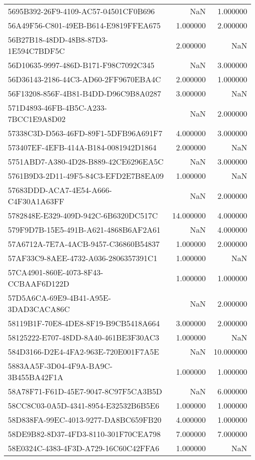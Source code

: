 \begin{tabular}{lrr}
5695B392-26F9-4109-AC57-04501CF0B696 & NaN & 1.000000 \\
56A49F56-C801-49EB-B614-E9819FFEA675 & 1.000000 & 2.000000 \\
56B27B18-48DD-48B8-87D3-1E594C7BDF5C & 2.000000 & NaN \\
56D10635-9997-486D-B171-F98C7092C345 & NaN & 3.000000 \\
56D36143-2186-44C3-AD60-2FF9670EBA4C & 2.000000 & 1.000000 \\
56F13208-856F-4B81-B4DD-D96C9B8A0287 & 3.000000 & NaN \\
571D4893-46FB-4B5C-A233-7BCC1E9A8D02 & NaN & 2.000000 \\
57338C3D-D563-46FD-89F1-5DFB96A691F7 & 4.000000 & 3.000000 \\
573407EF-4EFB-414A-B184-0081942D1864 & 2.000000 & NaN \\
5751ABD7-A380-4D28-B889-42CE6296EA5C & NaN & 3.000000 \\
5761B9D3-2D11-49F5-84C3-EFD2E7B8EA09 & 1.000000 & NaN \\
57683DDD-ACA7-4E54-A666-C4F30A1A63FF & NaN & 2.000000 \\
5782848E-E329-409D-942C-6B6320DC517C & 14.000000 & 4.000000 \\
579F9D7B-15E5-491B-A621-4868B6AF2A61 & NaN & 4.000000 \\
57A6712A-7E7A-4ACB-9457-C36860B54837 & 1.000000 & 2.000000 \\
57AF33C9-8AEE-4732-A036-2806357391C1 & 1.000000 & NaN \\
57CA4901-860E-4073-8F43-CCBAAF6D122D & 1.000000 & 1.000000 \\
57D5A6CA-69E9-4B41-A95E-3DAD3CACA86C & NaN & 2.000000 \\
58119B1F-70E8-4DE8-8F19-B9CB5418A664 & 3.000000 & 2.000000 \\
58125222-E707-48DD-8A40-461BE3F30AC3 & 1.000000 & NaN \\
584D3166-D2E4-4FA2-963E-720E001F7A5E & NaN & 10.000000 \\
5883AA5F-3D04-4F9A-BA9C-3B455BA42F1A & 1.000000 & 1.000000 \\
58A78F71-F61D-45E7-9047-8C97F5CA3B5D & NaN & 6.000000 \\
58CC8C03-0A5D-4341-8954-E32532B6B5E6 & 1.000000 & 1.000000 \\
58D838FA-99EC-4013-9277-DA8BC659FB20 & 4.000000 & 1.000000 \\
58DE9B82-8D37-4FD3-8110-301F70CEA798 & 7.000000 & 7.000000 \\
58E0324C-4383-4F3D-A729-16C60C42FFA6 & 1.000000 & NaN \\

\end{tabular}

